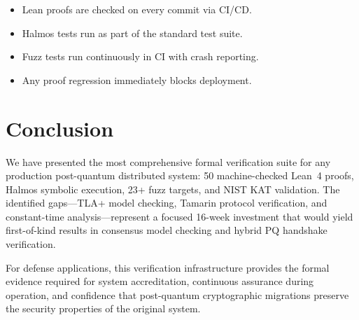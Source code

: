 \documentclass[11pt,letterpaper]{article}
\begin{document}
\begin{itemize}
\item Lean proofs are checked on every commit via CI/CD.
\item Halmos tests run as part of the standard test suite.
\item Fuzz tests run continuously in CI with crash reporting.
\item Any proof regression immediately blocks deployment.
\end{itemize}

\section{Conclusion}

We have presented the most comprehensive formal verification suite for any production post-quantum distributed system: 50 machine-checked Lean~4 proofs, Halmos symbolic execution, 23+ fuzz targets, and NIST KAT validation. The identified gaps---TLA+ model checking, Tamarin protocol verification, and constant-time analysis---represent a focused 16-week investment that would yield first-of-kind results in consensus model checking and hybrid PQ handshake verification.

For defense applications, this verification infrastructure provides the formal evidence required for system accreditation, continuous assurance during operation, and confidence that post-quantum cryptographic migrations preserve the security properties of the original system.
\end{document}
